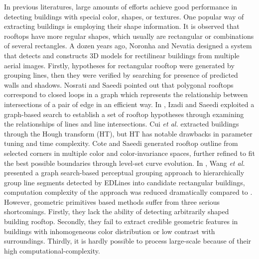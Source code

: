 	In previous literatures, large amounts of efforts achieve good performance in detecting buildings with special color, shapes, or textures. One popular way of extracting buildings is employing their shape information. It is observed that rooftops have more regular shapes, which usually are rectangular or combinations of several rectangles. A dozen years ago, Noronha and Nevatia \cite{noronha2001detection} designed a system that detects and constructs 3D models for rectilinear buildings from multiple aerial images. Firstly, hypotheses for rectangular rooftop were generated by grouping lines, then they were verified by searching for presence of predicted walls and shadows. Nosrati and Saeedi \cite{nosrati2009novel} pointed out that polygonal rooftops correspond to closed loops in a graph which represents the relationship between intersections of a pair of edge in an efficient way. In \cite{izadi2012three}, Izadi and Saeedi exploited a graph-based search to establish a set of rooftop hypotheses through examining the relationships of lines and line intersections. Cui \textit{et al.} \cite{cui2012complex} extracted buildings through the Hough transform (HT), but HT has notable drawbacks in parameter tuning and time complexity. Cote and Saeedi \cite{cote2013automatic} generated rooftop outline from selected corners in  multiple color and color-invariance spaces, further refined to fit the best possible boundaries through level-set curve evolution. In \cite{wang2015efficient}, Wang \textit{et al.}  presented a graph search-based perceptual grouping approach to hierarchically group line segments detected by EDLines \cite{akinlar2011edlines} into candidate rectangular buildings, computation complexity of the approach was reduced dramatically compared to \cite{noronha2001detection} \cite{izadi2012three} \cite{cote2013automatic} \cite{mayunga2007semi}. However, geometric primitives based methods suffer from three serious shortcomings. Firstly, they lack the ability of detecting arbitrarily shaped building rooftop. Secondly, they fail to  extract credible geometric features in buildings with inhomogeneous color distribution or low contrast with surroundings. Thirdly, it is hardly possible to process large-scale because of their high computational-complexity.	
	
